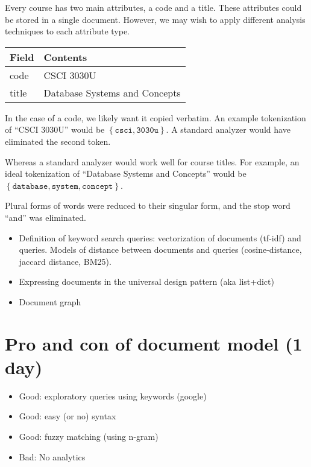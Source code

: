 		\begin{ex}
			Every course has two main attributes, a code and a title.  These attributes could be stored in a single document.  However, we may wish to apply different analysis techniques to each attribute type.
			
			\begin{table}
				\centering
				\begin{tabular}{ll}
					\toprule
					Field & Contents \\
					\midrule
					code & CSCI 3030U \\
					title & Database Systems and Concepts \\
					\bottomrule
				\end{tabular}
			\end{table}
			
			In the case of a code, we likely want it copied verbatim.  An example tokenization of ``CSCI 3030U'' would be $\left\{\texttt{csci}, \texttt{3030u}\right\}$.  A standard analyzer would have eliminated the second token.
			
			Whereas a standard analyzer would work well for course titles.  For example, an ideal tokenization of ``Database Systems and Concepts'' would be $\left\{\texttt{database}, \texttt{system}, \texttt{concept}\right\}$.
			
			Plural forms of words were reduced to their singular form, and the stop word ``and'' was eliminated.
		\end{ex}
	
	\begin{itemize}
		\item Definition of keyword search queries: vectorization of documents (tf-idf) and queries.  Models of distance between documents and queries (cosine-distance, jaccard distance, BM25).
		\item Expressing documents in the universal design pattern (aka list+dict)
		\item Document graph
	\end{itemize}

\section{Pro and con of document model (1 day)}
	\begin{itemize}
		\item Good: exploratory queries using keywords (google)
		\item Good: easy (or no) syntax
		\item Good: fuzzy matching (using n-gram)
		\item Bad: No analytics
	\end{itemize}
		
